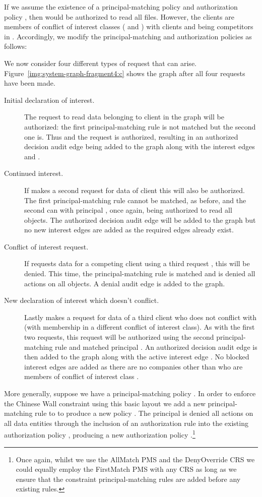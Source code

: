 \documentclass{article}
\begin{document}
If we assume the existence of a principal-matching policy  and authorization policy , then  would be authorized to read all files.
However, the clients are members of conflict of interest classes ( and ) with clients  and  being competitors in .
Accordingly, we modify the principal-matching and authorization policies as follows:


We now consider four different types of request that can arise.
Figure~\ref{img:system-graph-fragment4:c} shows the graph  after all four requests have been made.
\begin{description}
    \item[Initial declaration of interest.]
    The request  to read data belonging to client  in the graph  will be authorized:
    the first principal-matching rule is not matched but the second one is.
    Thus  and the request is authorized, resulting in an authorized decision audit edge  being added to the graph along with the interest edges  and . 
    \item[Continued interest.]
    If  makes a second request  for data of client  this will also be authorized.
    The first principal-matching rule cannot be matched, as before, and the second can with principal , once again, being authorized to read all objects.
    The authorized decision audit edge  will be added to the graph but no new interest edges are added as the required edges already exist.

    \item[Conflict of interest request.]
    If  requests data for a competing client  using a third request , this will be denied.
    This time, the principal-matching rule  is matched and  is denied all actions on all objects.
    A denial audit edge  is added to the graph.

    \item[New declaration of interest which doesn't conflict.]
    Lastly  makes a request  for data of a third client  who does not conflict with  (with membership in a different conflict of interest class).
    As with the first two requests, this request will be authorized using the second principal-matching rule and matched principal .
    An authorized decision audit edge  is then added to the graph along with the active interest edge .
    No blocked interest edges are added as there are no companies other than  who are members of conflict of interest class .

\end{description}

More generally, suppose we have a principal-matching policy .
In order to enforce the Chinese Wall constraint using this basic layout we add a new principal-matching rule  to  to produce a new policy .
The  principal is denied all actions on all data entities through the inclusion of an authorization rule  into the existing authorization policy , producing a new authorization policy .\footnote{Once again, whilst we use the \textsf{AllMatch} PMS and the \textsf{DenyOverride} CRS we could equally employ the \textsf{FirstMatch} PMS with any CRS as long as we ensure that the constraint principal-matching rules are added before any existing rules.}
\end{document}
